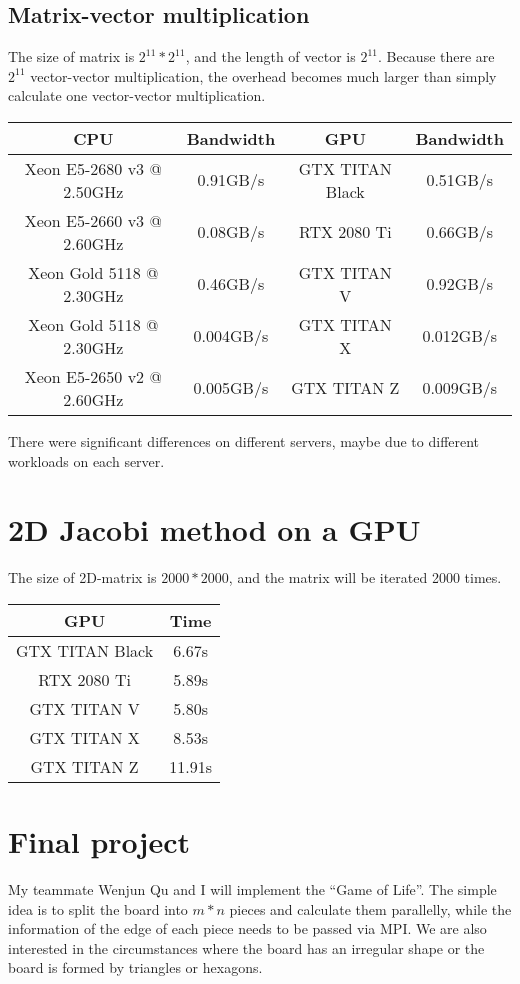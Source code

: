 \documentclass[12pt]{article}
\begin{document}
    \subsection*{Matrix-vector multiplication}
    The size of matrix is $2^{11} * 2^{11}$, and the length of vector is $2^{11}$. Because there are $2^{11}$ vector-vector multiplication, the overhead becomes much larger than simply calculate one vector-vector multiplication.
    \begin{table}[h!]
        \begin{tabular}{|c|c|c|c|}
        \hline
        CPU & Bandwidth & GPU & Bandwidth \\ \hline
        Xeon E5-2680 v3 @ 2.50GHz & 0.91GB/s & GTX TITAN Black & 0.51GB/s \\ \hline
        Xeon E5-2660 v3 @ 2.60GHz & 0.08GB/s & RTX 2080 Ti & 0.66GB/s \\ \hline
        Xeon Gold 5118 @ 2.30GHz & 0.46GB/s & GTX TITAN V & 0.92GB/s \\ \hline
        Xeon Gold 5118 @ 2.30GHz & 0.004GB/s & GTX TITAN X & 0.012GB/s \\ \hline
        Xeon E5-2650 v2 @ 2.60GHz & 0.005GB/s & GTX TITAN Z & 0.009GB/s \\ \hline
        \end{tabular}
    \end{table}
    There were significant differences on different servers, maybe due to different workloads on each server.
\section{2D Jacobi method on a GPU}
    The size of 2D-matrix is $2000*2000$, and the matrix will be iterated 2000 times.
    \begin{table}[h!]
        \begin{tabular}{|c|c|}
        \hline
        GPU & Time \\ \hline
        GTX TITAN Black & 6.67s \\ \hline
        RTX 2080 Ti & 5.89s \\ \hline
        GTX TITAN V & 5.80s \\ \hline
        GTX TITAN X & 8.53s \\ \hline
        GTX TITAN Z & 11.91s \\ \hline
        \end{tabular}
        \end{table}
\section{Final project}
    My teammate Wenjun Qu and I will implement the ``Game of Life''. The simple idea is to split the board into $m * n$ pieces and calculate them parallelly, while the information of the edge of each piece needs to be passed via MPI. We are also interested in the circumstances where the board has an irregular shape or the board is formed by triangles or hexagons. 
\end{document}
